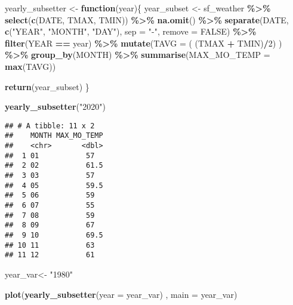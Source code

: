 \documentclass[
]{article}
\newenvironment{Shaded}{\begin{snugshade}}{\end{snugshade}}
\newcommand{\AttributeTok}[1]{\textcolor[rgb]{0.13,0.29,0.53}{#1}}
\newcommand{\ConstantTok}[1]{\textcolor[rgb]{0.56,0.35,0.01}{#1}}
\newcommand{\ControlFlowTok}[1]{\textcolor[rgb]{0.13,0.29,0.53}{\textbf{#1}}}
\newcommand{\DecValTok}[1]{\textcolor[rgb]{0.00,0.00,0.81}{#1}}
\newcommand{\FunctionTok}[1]{\textcolor[rgb]{0.13,0.29,0.53}{\textbf{#1}}}
\newcommand{\NormalTok}[1]{#1}
\newcommand{\OtherTok}[1]{\textcolor[rgb]{0.56,0.35,0.01}{#1}}
\newcommand{\SpecialCharTok}[1]{\textcolor[rgb]{0.81,0.36,0.00}{\textbf{#1}}}
\newcommand{\StringTok}[1]{\textcolor[rgb]{0.31,0.60,0.02}{#1}}
\begin{document}
\begin{Shaded}
\begin{Highlighting}[]
\NormalTok{yearly\_subsetter }\OtherTok{\textless{}{-}} \ControlFlowTok{function}\NormalTok{(year)\{}
\NormalTok{  year\_subset }\OtherTok{\textless{}{-}}\NormalTok{ sf\_weather }\SpecialCharTok{\%\textgreater{}\%}
    \FunctionTok{select}\NormalTok{(}\FunctionTok{c}\NormalTok{(DATE, TMAX, TMIN)) }\SpecialCharTok{\%\textgreater{}\%}
    \FunctionTok{na.omit}\NormalTok{() }\SpecialCharTok{\%\textgreater{}\%}
    \FunctionTok{separate}\NormalTok{(DATE, }\FunctionTok{c}\NormalTok{(}\StringTok{"YEAR"}\NormalTok{, }\StringTok{"MONTH"}\NormalTok{, }\StringTok{"DAY"}\NormalTok{), }\AttributeTok{sep =} \StringTok{"{-}"}\NormalTok{, }\AttributeTok{remove =} \ConstantTok{FALSE}\NormalTok{) }\SpecialCharTok{\%\textgreater{}\%}
    \FunctionTok{filter}\NormalTok{(YEAR }\SpecialCharTok{==}\NormalTok{ year) }\SpecialCharTok{\%\textgreater{}\%}
    \FunctionTok{mutate}\NormalTok{(}\AttributeTok{TAVG =}\NormalTok{ ( (TMAX }\SpecialCharTok{+}\NormalTok{ TMIN)}\SpecialCharTok{/}\DecValTok{2}\NormalTok{) ) }\SpecialCharTok{\%\textgreater{}\%}
    \FunctionTok{group\_by}\NormalTok{(MONTH) }\SpecialCharTok{\%\textgreater{}\%}
    \FunctionTok{summarise}\NormalTok{(}\AttributeTok{MAX\_MO\_TEMP =} \FunctionTok{max}\NormalTok{(TAVG))}
  
  \FunctionTok{return}\NormalTok{(year\_subset)}
\NormalTok{\}}

\FunctionTok{yearly\_subsetter}\NormalTok{(}\StringTok{"2020"}\NormalTok{)}
\end{Highlighting}
\end{Shaded}

\begin{verbatim}
## # A tibble: 11 x 2
##    MONTH MAX_MO_TEMP
##    <chr>       <dbl>
##  1 01           57  
##  2 02           61.5
##  3 03           57  
##  4 05           59.5
##  5 06           59  
##  6 07           55  
##  7 08           59  
##  8 09           67  
##  9 10           69.5
## 10 11           63  
## 11 12           61
\end{verbatim}

\begin{Shaded}
\begin{Highlighting}[]
\NormalTok{year\_var}\OtherTok{\textless{}{-}} \StringTok{"1980"}

\FunctionTok{plot}\NormalTok{(}\FunctionTok{yearly\_subsetter}\NormalTok{(}\AttributeTok{year =}\NormalTok{ year\_var) , }\AttributeTok{main =}\NormalTok{ year\_var)}
\end{Highlighting}
\end{Shaded}
\end{document}
